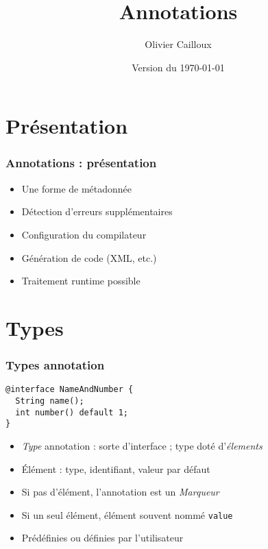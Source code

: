 \documentclass[english, french]{beamer}
\title{Annotations}
\author{Olivier Cailloux}
\institute[LAMSADE]{LAMSADE, Université Paris-Dauphine}
\date{Version du \today}
\begin{document}


\begin{frame}[plain]
   \titlepage
\end{frame}
\addtocounter{framenumber}{-1}

\section{Présentation}
\begin{frame}
	\frametitle{Annotations : présentation}
	\begin{itemize}
		\item Une forme de métadonnée
		\item Détection d’erreurs supplémentaires
		\item Configuration du compilateur
		\item Génération de code (XML, etc.)
		\item Traitement runtime possible
	\end{itemize}
\end{frame}

\section{Types}
\begin{frame}[fragile]
	\frametitle{Types annotation}
	\begin{lstlisting}
@interface NameAndNumber {
  String name();
  int number() default 1;
}
	\end{lstlisting}
	\begin{itemize}
		\item \emph{Type} annotation : sorte d’interface ; type doté d’\emph{élements}
		\item Élément : type, identifiant, valeur par défaut
		\item Si pas d’élément, l’annotation est un \emph{Marqueur}
		\item Si un seul élément, élément souvent nommé \texttt{value}
		\item Prédéfinies ou définies par l’utilisateur
	\end{itemize}
\end{frame}
\end{document}
